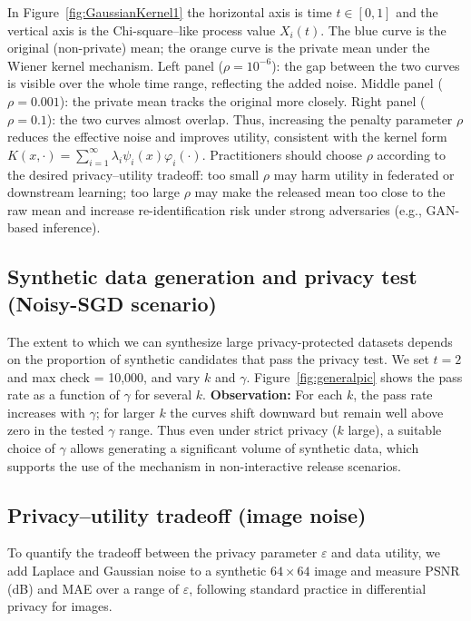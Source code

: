 \documentclass[journal,transmag]{IEEEtran}
\begin{document}
In Figure~\ref{fig:GaussianKernel1} the horizontal axis is time $t \in [0,1]$ and the vertical axis is the Chi-square--like process value $X_i(t)$. The blue curve is the original (non-private) mean; the orange curve is the private mean under the Wiener kernel mechanism. Left panel ($\rho = 10^{-6}$): the gap between the two curves is visible over the whole time range, reflecting the added noise. Middle panel ($\rho = 0.001$): the private mean tracks the original more closely. Right panel ($\rho = 0.1$): the two curves almost overlap. Thus, increasing the penalty parameter $\rho$ reduces the effective noise and improves utility, consistent with the kernel form $K(x,\cdot) = \sum_{i=1}^\infty \lambda_i \psi_i(x) \varphi_i(\cdot)$. Practitioners should choose $\rho$ according to the desired privacy--utility tradeoff: too small $\rho$ may harm utility in federated or downstream learning; too large $\rho$ may make the released mean too close to the raw mean and increase re-identification risk under strong adversaries (e.g., GAN-based inference).


\subsection{Synthetic data generation and privacy test (Noisy-SGD scenario)}

The extent to which we can synthesize large privacy-protected datasets depends on the proportion of synthetic candidates that pass the privacy test. We set $t = 2$ and max check = 10,000, and vary $k$ and $\gamma$. Figure~\ref{fig:generalpic} shows the pass rate as a function of $\gamma$ for several $k$. \textbf{Observation:} For each $k$, the pass rate increases with $\gamma$; for larger $k$ the curves shift downward but remain well above zero in the tested $\gamma$ range. Thus even under strict privacy ($k$ large), a suitable choice of $\gamma$ allows generating a significant volume of synthetic data, which supports the use of the mechanism in non-interactive release scenarios.


\subsection{Privacy--utility tradeoff (image noise)}

To quantify the tradeoff between the privacy parameter $\varepsilon$ and data utility, we add Laplace and Gaussian noise to a synthetic $64 \times 64$ image and measure PSNR (dB) and MAE over a range of $\varepsilon$, following standard practice in differential privacy for images.
\end{document}
